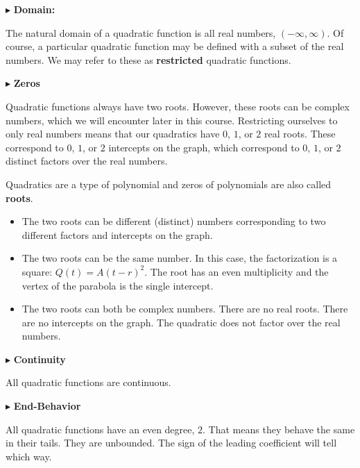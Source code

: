 \documentclass{ximera}
\begin{document}
$\blacktriangleright$ \textbf{\textcolor{red!10!blue!90!}{Domain:}} 

The natural domain of a quadratic function is all real numbers, $(-\infty, \infty)$.  Of course, a particular quadratic function may be defined with a subset of the real numbers.  We may refer to these as \textbf{restricted} quadratic functions.










$\blacktriangleright$ \textbf{\textcolor{red!10!blue!90!}{Zeros}} 

Quadratic functions always have two roots.  However, these roots can be complex numbers, which we will encounter later in this course.  Restricting ourselves to only real numbers means that our quadratics have $0$, $1$, or $2$ real roots.  These correspond to  $0$, $1$, or $2$ intercepts on the graph, which correspond to $0$, $1$, or $2$ distinct factors over the real numbers. 

Quadratics are a type of polynomial and zeros of polynomials are also called \textbf{roots}.

\begin{itemize}
\item The two roots can be different (distinct) numbers corresponding to two different factors and intercepts on the graph.  
\item The two roots can be the same number.  In this case, the factorization is a square: $Q(t) = A(t-r)^2$.  The root has an even multiplicity and the vertex of the parabola is the single intercept.
\item The two roots can both be complex numbers.  There are no real roots. There are no intercepts on the graph. The quadratic does not factor over the real numbers.
\end{itemize}




$\blacktriangleright$ \textbf{\textcolor{red!10!blue!90!}{Continuity}} 

All quadratic functions are continuous. 








$\blacktriangleright$ \textbf{\textcolor{red!10!blue!90!}{End-Behavior}} 

All quadratic functions have an even degree, $2$.   That means they behave the same in their tails.  They are unbounded.  The sign of the leading coefficient will tell which way. 
\end{document}
